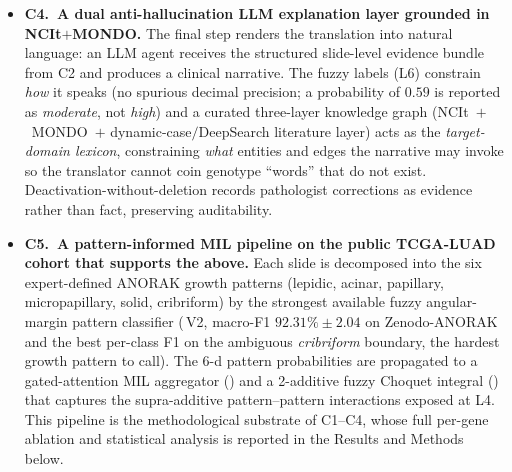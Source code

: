 \begin{itemize}
    \item \textbf{C4.\ A dual anti-hallucination LLM explanation
    layer grounded in NCIt$+$MONDO.}
    The final step renders the translation into natural language:
    an LLM agent receives the structured slide-level evidence bundle
    from C2 and produces a clinical narrative.
    The fuzzy labels (L6) constrain \emph{how} it speaks (no spurious
    decimal precision; a probability of $0.59$ is reported as
    \emph{moderate}, not \emph{high})
    and a curated three-layer knowledge graph
    (NCIt~$+$~MONDO~$+$ dynamic-case$/$DeepSearch literature layer)
    acts as the \emph{target-domain lexicon}, constraining \emph{what}
    entities and edges the narrative may invoke so the translator
    cannot coin genotype ``words'' that do not exist.
    Deactivation-without-deletion records pathologist corrections as
    evidence rather than fact, preserving auditability.

    \item \textbf{C5.\ A pattern-informed MIL pipeline on the public
    TCGA-LUAD cohort that supports the above.}
    Each slide is decomposed into the six expert-defined ANORAK
    growth patterns (lepidic, acinar, papillary, micropapillary,
    solid, cribriform)\cite{anorak2024} by the strongest available
    fuzzy angular-margin pattern classifier
    (\fuzzyarc{}\,V2\cite{limareina2026fuzzyarc}, macro-F1
    $92.31\%\!\pm\!2.04$ on Zenodo-ANORAK and the best per-class F1 on
    the ambiguous \emph{cribriform} boundary, the hardest growth
    pattern to call).
    The 6-d pattern probabilities are propagated to a gated-attention
    MIL aggregator (\piabmil{}) and a 2-additive fuzzy Choquet
    integral (\fcmil{}) that captures the supra-additive
    pattern--pattern interactions exposed at L4.
    This pipeline is the methodological substrate of C1--C4, whose
    full per-gene ablation and statistical analysis is reported in
    the Results and Methods below.
\end{itemize}

